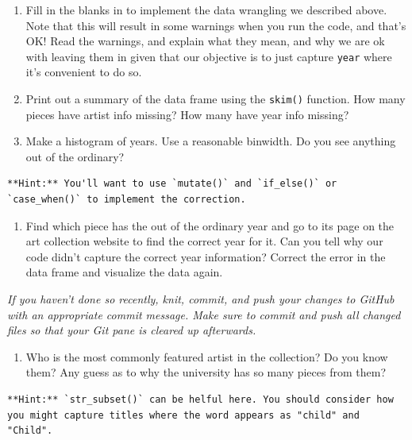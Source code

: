 \documentclass[
]{article}
\providecommand{\tightlist}{%
  \setlength{\itemsep}{0pt}\setlength{\parskip}{0pt}}
\begin{document}
\begin{enumerate}
\def\labelenumi{\arabic{enumi}.}
\setcounter{enumi}{8}
\tightlist
\item
  Fill in the blanks in to implement the data wrangling we described
  above. Note that this will result in some warnings when you run the
  code, and that's OK! Read the warnings, and explain what they mean,
  and why we are ok with leaving them in given that our objective is to
  just capture \texttt{year} where it's convenient to do so.
\item
  Print out a summary of the data frame using the \texttt{skim()}
  function. How many pieces have artist info missing? How many have year
  info missing?
\item
  Make a histogram of years. Use a reasonable binwidth. Do you see
  anything out of the ordinary?
\end{enumerate}

\begin{verbatim}
**Hint:** You'll want to use `mutate()` and `if_else()` or `case_when()` to implement the correction.
\end{verbatim}

\begin{enumerate}
\def\labelenumi{\arabic{enumi}.}
\setcounter{enumi}{11}
\tightlist
\item
  Find which piece has the out of the ordinary year and go to its page
  on the art collection website to find the correct year for it. Can you
  tell why our code didn't capture the correct year information? Correct
  the error in the data frame and visualize the data again.
\end{enumerate}

\emph{If you haven't done so recently, knit, commit, and push your
changes to GitHub with an appropriate commit message. Make sure to
commit and push all changed files so that your Git pane is cleared up
afterwards.}

\begin{enumerate}
\def\labelenumi{\arabic{enumi}.}
\setcounter{enumi}{12}
\tightlist
\item
  Who is the most commonly featured artist in the collection? Do you
  know them? Any guess as to why the university has so many pieces from
  them?
\end{enumerate}

\begin{verbatim}
**Hint:** `str_subset()` can be helful here. You should consider how you might capture titles where the word appears as "child" and "Child".
\end{verbatim}
\end{document}
